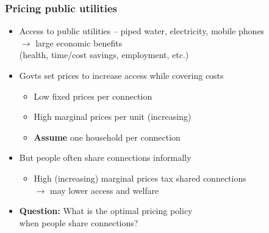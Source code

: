 \documentclass[aspectratio=149]{beamer}
\begin{document}
\begin{frame}
\frametitle{Pricing public utilities}
\begin{itemize}
\item Access to public utilities {\small -- piped water, electricity, mobile phones} \\
$\rightarrow$ large economic benefits  \\
        {\footnotesize{ {(health, time/cost savings, employment, etc.)}  }}\\

  \vspace{.3cm}     
\item Govts set prices to increase access while covering costs
  \vspace{.1cm}
  \begin{itemize}
    \item Low fixed prices per connection
    \item High marginal prices per unit (increasing)
    \vspace{.1cm}
    \item \textbf{Assume} one household per connection
  \end{itemize}
  \vspace{.2cm}
\item But people often share connections informally
\vspace{.1cm}
  \begin{itemize}
    \item High (increasing) marginal prices tax shared connections \\ 
$\rightarrow$ may lower access and welfare
  \end{itemize}
  \vspace{.1cm}
  \vspace{.3cm}
\item \textbf{Question:} What is the optimal pricing policy \\
\hspace{2.4cm} when people share connections?
\end{itemize}
\end{frame}


\end{document}
